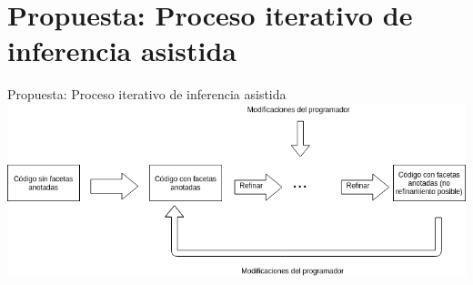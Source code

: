 \documentclass[aspectratio=169,10pt]{beamer}
\begin{document}
\section{Propuesta: Proceso iterativo de inferencia asistida}
\begin{frame}[fragile]{Propuesta: Proceso iterativo de inferencia asistida}
  \includegraphics[width=1.0\textwidth]{img/diagrama.png}
\end{frame}
\end{document}
